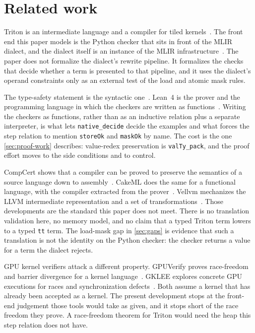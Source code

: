 \documentclass[a4paper,UKenglish,anonymous,cleveref,autoref]{lipics-v2021}
\begin{document}
\section{Related work}
\label{sec:related}

Triton is an intermediate language and a compiler for tiled kernels~\cite{tillet2019triton}.
The front end this paper models is the Python checker that sits in front of the MLIR dialect, and the dialect itself is an instance of the MLIR infrastructure~\cite{lattner2021mlir}.
The paper does not formalize the dialect's rewrite pipeline.
It formalizes the checks that decide whether a term is presented to that pipeline, and it uses the dialect's operand constraints only as an external test of the load and atomic mask rules.

The type-safety statement is the syntactic one~\cite{wright1994syntactic,pierce2002tapl}.
Lean~4 is the prover and the programming language in which the checkers are written as functions~\cite{demoura2021lean}.
Writing the checkers as functions, rather than as an inductive relation plus a separate interpreter, is what lets \texttt{native\_decide} decide the examples and what forces the step relation to mention \texttt{storeOk} and \texttt{maskOk} by name.
The cost is the one \cref{sec:proof-work} describes: value-redex preservation is \texttt{valTy\_pack}, and the proof effort moves to the side conditions and to control.

CompCert shows that a compiler can be proved to preserve the semantics of a source language down to assembly~\cite{leroy2009compcert}.
CakeML does the same for a functional language, with the compiler extracted from the prover~\cite{kumar2014cakeml}.
Vellvm mechanizes the LLVM intermediate representation and a set of transformations~\cite{zhao2012vellvm}.
Those developments are the standard this paper does not meet.
There is no translation validation here, no memory model, and no claim that a typed Triton term lowers to a typed \texttt{tt} term.
The load-mask gap in \cref{sec:gaps} is evidence that such a translation is not the identity on the Python checker: the checker returns a value for a term the dialect rejects.

GPU kernel verifiers attack a different property.
GPUVerify proves race-freedom and barrier divergence for a kernel language~\cite{betts2012gpuverify}.
GKLEE explores concrete GPU executions for races and synchronization defects~\cite{li2012gklee}.
Both assume a kernel that has already been accepted as a kernel.
The present development stops at the front-end judgement those tools would take as given, and it stops short of the race freedom they prove.
A race-freedom theorem for Triton would need the heap this step relation does not have.
\end{document}
